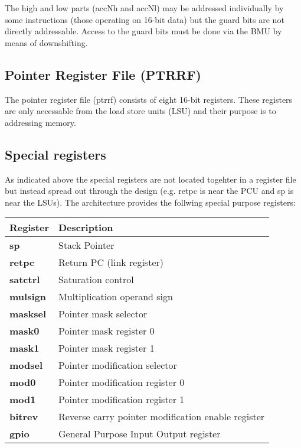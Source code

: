 \documentclass[11pt]{book}
\begin{document}
The high and low parts (accNh and accNl) may be addressed individually
by some instructions (those operating on 16-bit data) but the guard
bits are not directly addressable. Access to the guard bits must be
done via the BMU by means of downshifting.

\subsection{Pointer Register File (PTRRF)}
The pointer register file (ptrrf) consists of eight 16-bit
registers. These registers are only accessable from the load store
units (LSU) and their purpose is to addressing memory.  \break

\subsection{Special registers}
As indicated above the special registers are not located togehter in a
register file but instead spread out through the design (e.g. retpc is
near the PCU and sp is near the LSUs).
\break
The architecture provides the follwing special purpose registers:
\begin{center}
  \begin{tabular}{ | l | l |}
    \hline
    \cellcolor{lightgray} Register & \cellcolor{lightgray} Description \\ \hline
    \textbf{sp} & Stack Pointer \\ \hline
    \textbf{retpc} & Return PC (link register) \\ \hline
    \textbf{satctrl} & Saturation control \\ \hline
    \textbf{mulsign} & Multiplication operand sign \\ \hline
    \textbf{masksel} & Pointer mask selector \\ \hline
    \textbf{mask0}   & Pointer mask register 0 \\ \hline
    \textbf{mask1}   & Pointer mask register 1 \\ \hline
    \textbf{modsel}  & Pointer modification selector \\ \hline
    \textbf{mod0}    & Pointer modification register 0 \\ \hline
    \textbf{mod1}    & Pointer modification register 1 \\ \hline
    \textbf{bitrev}  & Reverse carry pointer modification enable register \\ \hline
    \textbf{gpio}    & General Purpose Input Output register \\
    \hline
  \end{tabular}
\end{center}
\end{document}
